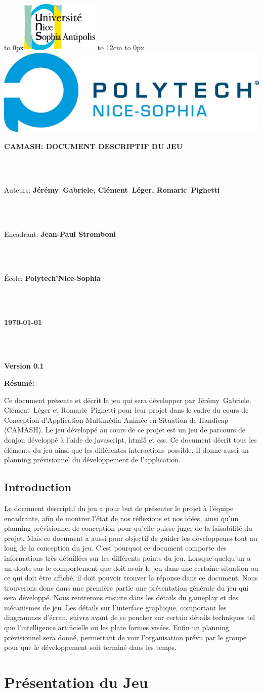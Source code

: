 \documentclass[a4paper, 11pt]{report}
\def\maketitle{
  \hspace{-3.5cm}
    \hbox to 0px{\includegraphics[scale = 0.7]{LOGO_UNS.png}}  
    \hbox to 12cm{}  
    \hbox to 0px{\includegraphics[scale = 1.1]{Polytech.jpg}} 
  \vfill
  \begin{center}\leavevmode
    \normalfont
    {\LARGE \textbf{CAMASH: DOCUMENT DESCRIPTIF DU JEU}\par}%
    ~~\\
    ~~\\
    {\Large Auteurs:\textbf{ Jérémy~Gabriele, Clément~Léger, Romaric~Pighetti} \par}%
    ~~\\
    ~~\\
    {\Large Encadrant: \textbf{Jean-Paul Stromboni} \par}%
    ~~\\
    ~~\\
    {\Large \'Ecole: \textbf{Polytech'Nice-Sophia} \par}%
    ~~\\
    ~~\\
    {\Large \textbf{\today}   \par}%
    ~~\\
    ~~\\
    {\Large \textbf{Version 0.1}   \par}
    \vspace {3cm}
    {\Large \textbf{Résumé:}\par}%
    \end{center}%
    Ce document présente et décrit le jeu qui sera développer par Jérémy~Gabriele, Clément~Léger et 
    Romaric~Pighetti pour leur projet dans le cadre du cours de Conception d'Application Multimédia
    Animée en Situation de Handicap (CAMASH). Le jeu développé au cours de ce projet est un jeu de 
    parcours de donjon développé à l'aide de javascript, html5 et css. Ce document décrit tous les éléments
    du jeu ainsi que les différentes interactions possible. Il donne aussi un planning prévisionnel du 
    développement de l'application.
  \vfill
  \null
  \clearpage
}
\begin{document}
  \maketitle
  
  \chapter*{Introduction}
    Le document descriptif du jeu a pour but de présenter le projet à l'équipe encadrante, afin de montrer
    l'état de nos réflexions et nos idées, ainsi qu'un planning prévisionnel de conception pour qu'elle puisse
    juger de la faisabilité du projet. Mais ce document a aussi pour objectif de guider les développeurs tout
    au long de la conception du jeu. C'est pourquoi ce document comporte des informations très détaillées
    sur les différents points du jeu. Lorsque quelqu'un a un doute sur le comportement que doit avoir le jeu
    dans une certaine situation ou ce qui doit \^etre affiché, il doit pouvoir trouver la réponse dans ce
    document. Nous trouverons donc dans une première partie une présentation générale du jeu qui sera
    développé. Nous rentrerons ensuite dans les détails du gameplay et des mécanismes de jeu. Les détails
    sur l'interface graphique, comportant les diagrammes d'écran, suivra avant de se pencher sur certain 
    détails techniques tel que l'intelligence artificielle ou les plate formes visées. Enfin un planning 
    prévisionnel sera donné, permettant de voir l'organisation prévu par le groupe pour que le 
    développement soit terminé dans les temps.

  \tableofcontents

  \part{Présentation du Jeu}
\end{document}
